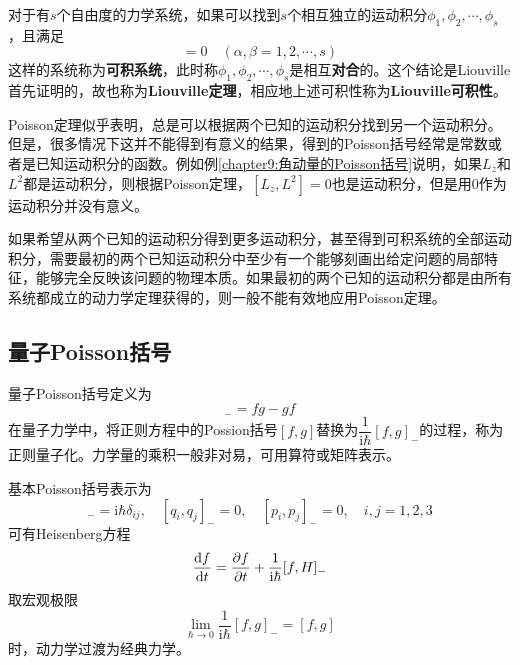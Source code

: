 对于有$s$个自由度的力学系统，如果可以找到$s$个相互独立的运动积分$\phi_1,\phi_2,\cdots,\phi_s$，且满足
\begin{equation}
	[\phi_\alpha,\phi_\beta] = 0\quad (\alpha,\beta = 1,2,\cdots,s)
\end{equation}
这样的系统称为{\bf 可积系统}，此时称$\phi_1,\phi_2,\cdots,\phi_s$是相互{\bf 对合}的。这个结论是Liouville首先证明的，故也称为{\bf Liouville定理}，相应地上述可积性称为{\bf Liouville可积性}。

Poisson定理似乎表明，总是可以根据两个已知的运动积分找到另一个运动积分。但是，很多情况下这并不能得到有意义的结果，得到的Poisson括号经常是常数或者是已知运动积分的函数。例如例\ref{chapter9:角动量的Poisson括号}说明，如果$L_z$和$L^2$都是运动积分，则根据Poisson定理，$[L_z,L^2]=0$也是运动积分，但是用$0$作为运动积分并没有意义。

如果希望从两个已知的运动积分得到更多运动积分，甚至得到可积系统的全部运动积分，需要最初的两个已知运动积分中至少有一个能够刻画出给定问题的局部特征，能够完全反映该问题的物理本质。如果最初的两个已知的运动积分都是由所有系统都成立的动力学定理获得的，则一般不能有效地应用Poisson定理。

\subsection{量子Poisson括号}

量子Poisson括号定义为
\begin{equation}
	[f,g]_{-} = fg - gf
\end{equation}
在量子力学中，将正则方程中的Possion括号$[f,g]$替换为$\dfrac{1}{\mathrm{i}\hbar} [f,g]_{-}$的过程，称为{\heiti 正则量子化}。力学量的乘积一般非对易，可用算符或矩阵表示。

基本Poisson括号表示为
\begin{equation}
	[q_i,p_j]_{-} = \mathrm{i} \hbar \delta_{ij},\quad [q_i,q_j]_{-} = 0,\quad [p_i,p_j]_{-} = 0,\quad i,j=1,2,3
\end{equation}
可有{\heiti Heisenberg方程}
\begin{equation}
	\frac{\mathrm{d} f}{\mathrm{d} t} = \frac{\partial f}{\partial t} + \frac{1}{\mathrm{i} \hbar} [f,H]_{-}
\end{equation}
取宏观极限
\begin{equation*}
	\lim_{\hbar \to 0} \frac{1}{\mathrm{i} \hbar} [f,g]_{-} = [f,g]
\end{equation*}
时，动力学过渡为经典力学。
